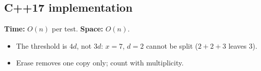 
\subsection*{C++17 implementation}

\begin{complexitybox}
\textbf{Time:} $O(n)$ per test. \textbf{Space:} $O(n)$.
\end{complexitybox}

\begin{pitfallbox}
\begin{itemize}
  \item The threshold is $4d$, not $3d$: $x=7$, $d=2$ cannot be split
        ($2+2+3$ leaves $3$).
  \item Erase removes one copy only; count with multiplicity.
\end{itemize}
\end{pitfallbox}
